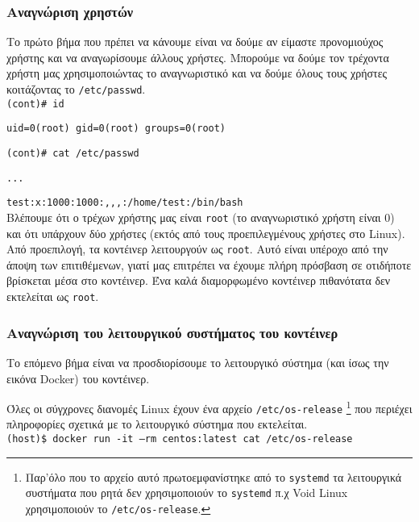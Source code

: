 \subsubsection{Αναγνώριση χρηστών}

Το πρώτο βήμα που πρέπει να κάνουμε είναι να δούμε αν είμαστε προνομιούχος
χρήστης και να αναγωρίσουμε άλλους χρήστες. Μπορούμε να δούμε τον τρέχοντα
χρήστη μας χρησιμοποιώντας το αναγνωριστικό και να δούμε όλους τους χρήστες
κοιτάζοντας το \texttt{\textlatin{/etc/passwd}}. \\

\texttt{\textlatin{(cont)\# id}}

\texttt{\textlatin{uid=0(root) gid=0(root) groups=0(root)}}

\texttt{\textlatin{(cont)\# cat /etc/passwd}}

\texttt{\textlatin{...}}

\texttt{\textlatin{test:x:1000:1000:,,,:/home/test:/bin/bash}} \\

Βλέπουμε ότι ο τρέχων χρήστης μας είναι \texttt{\textlatin{root}} (το
αναγνωριστικό χρήστη είναι 0) και ότι υπάρχουν δύο χρήστες (εκτός από τους
προεπιλεγμένους χρήστες στο \textlatin{Linux}). Από προεπιλογή, τα κοντέινερ
λειτουργούν ως \texttt{\textlatin{root}}. Αυτό είναι υπέροχο από την άποψη των
επιτιθέμενων, γιατί μας επιτρέπει να έχουμε πλήρη πρόσβαση σε οτιδήποτε
βρίσκεται μέσα στο κοντέινερ. Ένα καλά διαμορφωμένο κοντέινερ πιθανότατα δεν
εκτελείται ως \texttt{\textlatin{root}}.

\subsubsection{Αναγνώριση του λειτουργικού συστήματος του κοντέινερ}

Το επόμενο βήμα είναι να προσδιορίσουμε το λειτουργικό σύστημα (και ίσως την
εικόνα \textlatin{Docker}) του κοντέινερ.

Όλες οι σύγχρονες διανομές \textlatin{Linux} έχουν ένα αρχείο
\texttt{\textlatin{/etc/os-release}} \footnote{Παρ'όλο που το αρχείο αυτό
πρωτοεμφανίστηκε από το \texttt{\textlatin{systemd}} τα λειτουργικά συστήματα
που ρητά δεν χρησιμοποιούν το \texttt{\textlatin{systemd}} π.χ
\textlatin{Void Linux} χρησιμοποιούν το \texttt{\textlatin{/etc/os-release}}.}
που περιέχει πληροφορίες σχετικά με το λειτουργικό σύστημα που εκτελείται. \\

\texttt{\textlatin{(host)\$ docker run -it --rm centos:latest cat /etc/os-release}}

